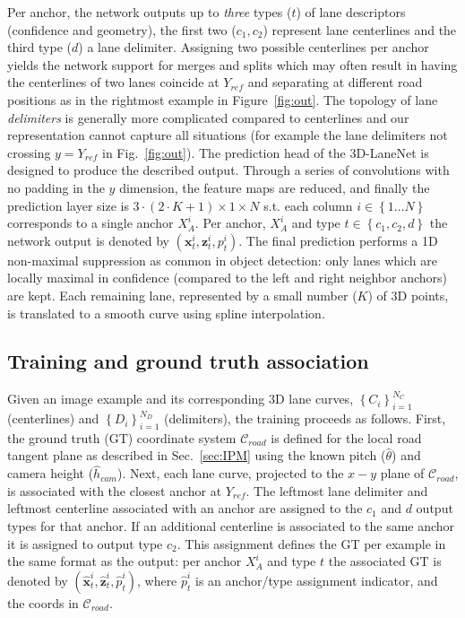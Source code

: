 \documentclass[10pt,twocolumn,letterpaper]{article}
\begin{document}
Per anchor, the network outputs up to \emph{three} types ($t$) of lane descriptors (confidence and geometry), the first two ($c_1,c_2$) represent lane centerlines and the third type ($d$) a lane delimiter. Assigning two possible centerlines per anchor yields the network support for merges and splits which may often result in having the centerlines of two lanes coincide at $Y_{ref}$ and separating at different road positions as in the rightmost example in Figure~\ref{fig:out}. The topology of lane \textit{delimiters} is generally more complicated compared to centerlines and our representation cannot capture all situations (for example the lane delimiters not crossing $y=Y_{ref}$ in Fig.~\ref{fig:out}). The prediction head of the 3D-LaneNet is designed to produce the described output. Through a series of convolutions with no padding in the $y$ dimension, the feature maps are reduced, and finally the prediction layer size is $3\cdot \left(2\cdot K +1\right)\times 1 \times N$ s.t. each column $i\in\left\lbrace 1\ldots N\right\rbrace$ corresponds to a single anchor $X_A^i$. Per anchor, $X_A^i$ and type $t\in \left\lbrace c_1, c_2, d\right\rbrace$ the network output is denoted by $\left(\mathbf{x}_t^i,\mathbf{z}_t^i,p_t^i\right)$. 
The final prediction performs a 1D non-maximal suppression as common in object detection: only lanes which are locally maximal in confidence (compared to the left and right neighbor anchors) are kept. Each remaining lane, represented by a small number ($K$) of 3D points, is translated to a smooth curve using spline interpolation.  


\subsection{Training and ground truth association}\label{sec:training}

Given an image example and its corresponding 3D lane curves, $\left\lbrace C_i\right\rbrace_{i=1}^{N_C}$ (centerlines) and $\left\lbrace D_i\right\rbrace_{i=1}^{N_D}$ (delimiters), the training proceeds as follows. First, the ground truth (GT) coordinate system $\mathcal{C}_{road}$ is defined for the local road tangent plane as described in Sec.~\ref{sec:IPM} using the known pitch ($\hat{\theta}$) and camera height ($\hat{h}_{cam}$). Next, each lane curve, projected to the $x-y$ plane of $\mathcal{C}_{road}$, is associated with the closest anchor at $Y_{ref}$. The leftmost lane delimiter and leftmost centerline associated with an anchor are assigned to the $c_1$ and $d$ output types for that anchor. If an additional centerline is associated to the same anchor it is assigned to output type $c_2$. This assignment defines the GT per example in the same format as the output: per anchor $X_A^i$ and type $t$ the associated GT is denoted by $\left(\mathbf{\hat{x}}_t^i,\mathbf{\hat{z}}_t^i,\hat{p}_t^i\right)$, where $\hat{p}_t^i$ is an anchor/type assignment indicator, and the coords in $\mathcal{C}_{road}$.  
\end{document}
